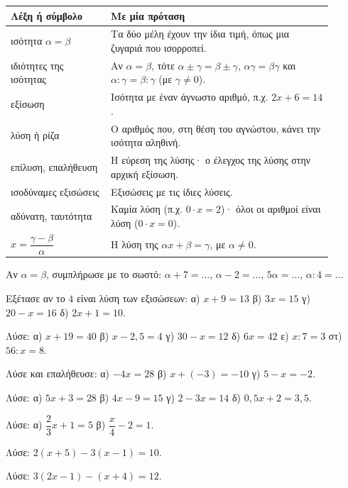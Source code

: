 

\renewcommand{\arraystretch}{1.5}
\begin{longtable}{@{}>{\raggedright\arraybackslash}p{0.28\linewidth} >{\raggedright\arraybackslash}p{0.62\linewidth}@{}}
\toprule
\textbf{Λέξη ή σύμβολο} & \textbf{Με μία πρόταση}\\
\midrule
\endhead
ισότητα $\alpha=\beta$ & Τα δύο μέλη έχουν την ίδια τιμή, όπως μια ζυγαριά που ισορροπεί.\\
ιδιότητες της ισότητας & Αν $\alpha=\beta$, τότε $\alpha\pm\gamma=\beta\pm\gamma$, $\alpha\gamma=\beta\gamma$ και $\alpha:\gamma=\beta:\gamma$ (με $\gamma\neq0$).\\
εξίσωση & Ισότητα με έναν άγνωστο αριθμό, π.χ. $2x+6=14$.\\
λύση ή ρίζα & Ο αριθμός που, στη θέση του αγνώστου, κάνει την ισότητα αληθινή.\\
επίλυση, επαλήθευση & Η εύρεση της λύσης· ο έλεγχος της λύσης στην αρχική εξίσωση.\\
ισοδύναμες εξισώσεις & Εξισώσεις με τις ίδιες λύσεις.\\
αδύνατη, ταυτότητα & Καμία λύση (π.χ. $0\cdot x=2$)· όλοι οι αριθμοί είναι λύση ($0\cdot x=0$).\\
$x=\dfrac{\gamma-\beta}{\alpha}$ & Η λύση της $\alpha x+\beta=\gamma$, με $\alpha\neq0$.\\
\bottomrule
\end{longtable}


\ex Αν $\alpha=\beta$, συμπλήρωσε με το σωστό: $\alpha+7=\dots$, \quad $\alpha-2=\dots$, \quad $5\alpha=\dots$, \quad $\alpha:4=\dots$

\ex Εξέτασε αν το $4$ είναι λύση των εξισώσεων: α) $x+9=13$ \quad β) $3x=15$ \quad γ) $20-x=16$ \quad δ) $2x+1=10$.

\ex Λύσε: α) $x+19=40$ \quad β) $x-2{,}5=4$ \quad γ) $30-x=12$ \quad δ) $6x=42$ \quad ε) $x:7=3$ \quad στ) $56:x=8$.

\ex Λύσε και επαλήθευσε: α) $-4x=28$ \quad β) $x+(-3)=-10$ \quad γ) $5-x=-2$.

\ex Λύσε: α) $5x+3=28$ \quad β) $4x-9=15$ \quad γ) $2-3x=14$ \quad δ) $0{,}5x+2=3{,}5$.

\ex Λύσε: α) $\dfrac{2}{3}x+1=5$ \quad β) $\dfrac{x}{4}-2=1$.

\ex Λύσε: $2(x+5)-3(x-1)=10$.

\ex Λύσε: $3(2x-1)-(x+4)=12$.

